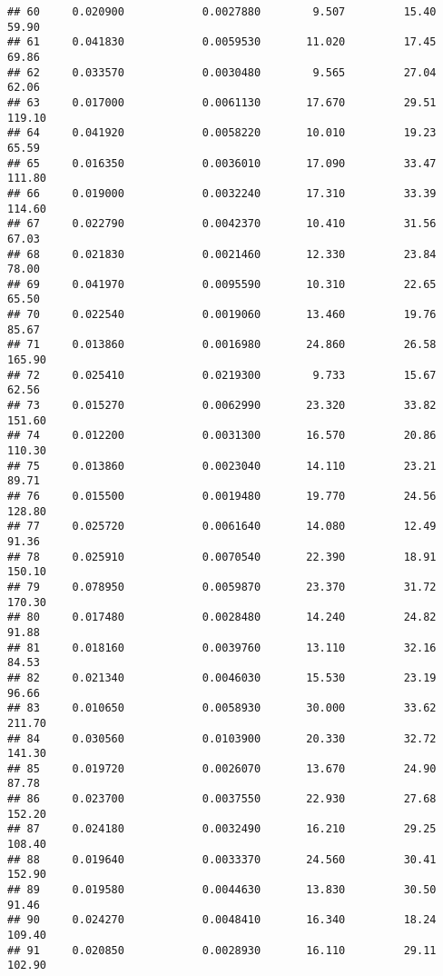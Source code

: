 \documentclass[
]{article}
\begin{document}
\begin{verbatim}
## 60     0.020900            0.0027880        9.507         15.40           59.90
## 61     0.041830            0.0059530       11.020         17.45           69.86
## 62     0.033570            0.0030480        9.565         27.04           62.06
## 63     0.017000            0.0061130       17.670         29.51          119.10
## 64     0.041920            0.0058220       10.010         19.23           65.59
## 65     0.016350            0.0036010       17.090         33.47          111.80
## 66     0.019000            0.0032240       17.310         33.39          114.60
## 67     0.022790            0.0042370       10.410         31.56           67.03
## 68     0.021830            0.0021460       12.330         23.84           78.00
## 69     0.041970            0.0095590       10.310         22.65           65.50
## 70     0.022540            0.0019060       13.460         19.76           85.67
## 71     0.013860            0.0016980       24.860         26.58          165.90
## 72     0.025410            0.0219300        9.733         15.67           62.56
## 73     0.015270            0.0062990       23.320         33.82          151.60
## 74     0.012200            0.0031300       16.570         20.86          110.30
## 75     0.013860            0.0023040       14.110         23.21           89.71
## 76     0.015500            0.0019480       19.770         24.56          128.80
## 77     0.025720            0.0061640       14.080         12.49           91.36
## 78     0.025910            0.0070540       22.390         18.91          150.10
## 79     0.078950            0.0059870       23.370         31.72          170.30
## 80     0.017480            0.0028480       14.240         24.82           91.88
## 81     0.018160            0.0039760       13.110         32.16           84.53
## 82     0.021340            0.0046030       15.530         23.19           96.66
## 83     0.010650            0.0058930       30.000         33.62          211.70
## 84     0.030560            0.0103900       20.330         32.72          141.30
## 85     0.019720            0.0026070       13.670         24.90           87.78
## 86     0.023700            0.0037550       22.930         27.68          152.20
## 87     0.024180            0.0032490       16.210         29.25          108.40
## 88     0.019640            0.0033370       24.560         30.41          152.90
## 89     0.019580            0.0044630       13.830         30.50           91.46
## 90     0.024270            0.0048410       16.340         18.24          109.40
## 91     0.020850            0.0028930       16.110         29.11          102.90

\end{verbatim}
\end{document}
